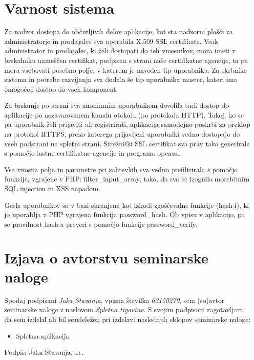 \documentclass[a4paper,12pt]{report}
\newcommand{\naslov}     {Spletna trgovina}
\newcommand{\prviavtor}  {Jaka Stavanja}
\newcommand{\prviindeks} {63150270}
\begin{document}
\chapter{Varnost sistema}

Za nadzor dostopa do občutljivih delov aplikacije, kot sta nadzorni plošči za administratorje in prodajalce sva uporabila X.509 SSL certifikate. Vsak administrator in prodajalec, ki želi dostopati do teh vmesnikov, mora imeti v brskalniku nameščen certifikat, podpisan s strani naše certifikatne agencije, ta pa mora vsebovati posebno polje, v katerem je naveden tip uporabnika. Za skrbnike sistema in potrebe razvijanja sva dodala še tip uporabnika master, kateri ima omogočen dostop do vseh komponent.

Za brskanje po strani sva anonimnim uporabnikom dovolila tudi dostop do aplikacije po nezavarovanem kanalu otokolu (po protokolu HTTP). Takoj, ko se pa uporabnik želi prijaviti ali registrirati, aplikacija samodejno poskrbi za preklop na protokol HTTPS, preko katerega prijavljeni uporabniki vedno dostopajo do vseh podstrani na spletni strani. Strežniški SSL certifikat sva prav tako generirala s pomočjo lastne certifikatne agencije in programa openssl.

Vsa vnosna polja in parametre pri zahtevkih sva vedno prefiltrirala s pomočjo funkcije, vgrajene v PHP: filter\_input\_array, tako, da sva se izognila morebitnim SQL injection in XSS napadom.

Gesla uporabnikov so v bazi shranjena kot izhodi zgoščevalne funkcije (hash-i), ki jo uporablja v PHP vgrajena funkcija password\_hash. Ob vpisu v aplikacijo, pa se pravilnost hash-a preveri s pomočjo funkcije password\_verify.

\chapter{Izjava o avtorstvu seminarske naloge}

Spodaj podpisani \textit{\prviavtor}, vpisna številka \textit{\prviindeks}, sem (so)avtor seminarske naloge z naslovom \textit{\naslov}. S svojim podpisom zagotavljam, da sem izdelal ali bil soudeležen pri izdelavi naslednjih sklopov seminarske naloge:
\begin{itemize}
    \item Spletna aplikacija
\end{itemize}

Podpis: {\prviavtor}, l.r.
\end{document}
